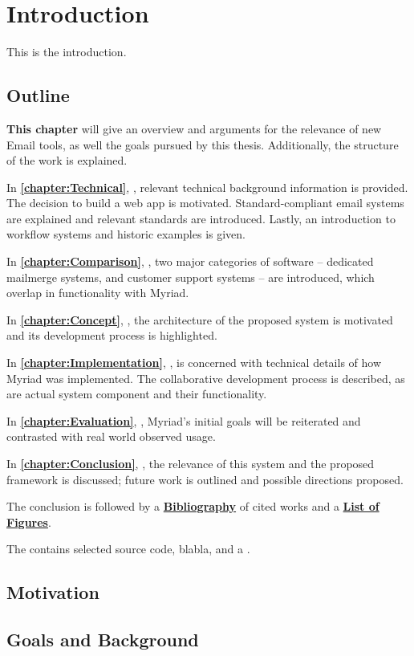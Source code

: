 \chapter{Introduction}
\label{chapter:Introduction}

This is the introduction.

\section{Outline}

\textbf{This chapter} will give an overview and arguments for the relevance of new Email tools, as well the goals pursued by this thesis. Additionally, the structure of the work is explained.

In \textbf{\autoref{chapter:Technical}}, \textbf{}, relevant technical background information is provided. The decision to build a web app is motivated. Standard-compliant email systems are explained and relevant standards are introduced. Lastly, an introduction to workflow systems and historic examples is given.

In \textbf{\autoref{chapter:Comparison}}, \textbf{},  two major categories of software -- dedicated mailmerge systems, and customer support systems -- are introduced, which overlap in functionality with Myriad.

In \textbf{\autoref{chapter:Concept}}, \textbf{}, the architecture of the proposed system is motivated and its development process is highlighted.

In \textbf{\autoref{chapter:Implementation}}, \textbf{}, is concerned with technical details of how Myriad was implemented. The collaborative development process is described, as are actual system component and their functionality.

In \textbf{\autoref{chapter:Evaluation}}, \textbf{}, Myriad's initial goals will be reiterated and contrasted with real world observed usage.

In \textbf{\autoref{chapter:Conclusion}}, \textbf{},  the relevance of this system and the proposed framework is discussed; future work is outlined and possible directions proposed.

The conclusion is followed by a \textbf{\hyperref[chapter:Bibliography]{Bibliography}} of cited works and a \textbf{\hyperref[chapter:Figures]{List of Figures}}.

The \textbf{} contains selected source code, blabla, and a \textbf{}.



\section{Motivation}
\section{Goals and Background}